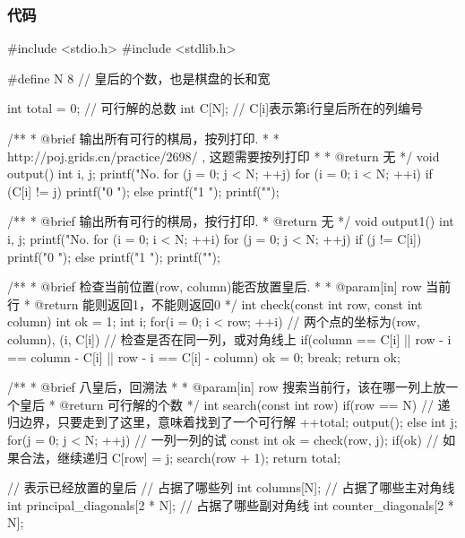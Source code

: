 \subsubsection{代码}
\begin{Codex}[label=eight_queen.c]
#include <stdio.h>
#include <stdlib.h>

#define N 8 // 皇后的个数，也是棋盘的长和宽

int total = 0;  // 可行解的总数
int C[N];  // C[i]表示第i行皇后所在的列编号

/**
 * @brief 输出所有可行的棋局，按列打印.
 *
 * http://poj.grids.cn/practice/2698/ , 这题需要按列打印
 *
 * @return 无
 */
void output() {
    int i, j;
    printf("No. %
    for (j = 0; j < N; ++j) {
        for (i = 0; i < N; ++i) {
            if (C[i] != j) {
                printf("0 ");
            } else {
                printf("1 ");
            }
        }
        printf("\n");
    }
}

/**
 * @brief 输出所有可行的棋局，按行打印.
 * @return 无
 */
void output1() {
    int i, j;
    printf("No. %
    for (i = 0; i < N; ++i) {
        for (j = 0; j < N; ++j) {
            if (j != C[i]) {
                printf("0 ");
            } else {
                printf("1 ");
            }
        }
        printf("\n");
    }
}

/**
 * @brief 检查当前位置(row, column)能否放置皇后.
 *
 * @param[in] row 当前行
 * @return 能则返回1，不能则返回0
 */
int check(const int row, const int column) {
    int ok = 1;
    int i;
    for(i = 0; i < row; ++i) {
        // 两个点的坐标为(row, column), (i, C[i])
        // 检查是否在同一列，或对角线上
        if(column == C[i] || row - i == column - C[i] ||
            row - i == C[i] - column) {
            ok = 0;
            break;
        }
    }
    return ok;
}

/**
 * @brief 八皇后，回溯法
 *
 * @param[in] row 搜索当前行，该在哪一列上放一个皇后
 * @return 可行解的个数
 */
int search(const int row) {
    if(row == N) {  // 递归边界，只要走到了这里，意味着找到了一个可行解
        ++total;
        output();
    } else {
        int j;
        for(j = 0; j < N; ++j) {  // 一列一列的试
            const int ok = check(row, j);
            if(ok) {  // 如果合法，继续递归
                C[row] = j;
                search(row + 1);
            }
        }
    }
    return total;
}

// 表示已经放置的皇后
// 占据了哪些列
int columns[N];
// 占据了哪些主对角线
int principal_diagonals[2 * N];
// 占据了哪些副对角线
int counter_diagonals[2 * N];


\end{Codex}
